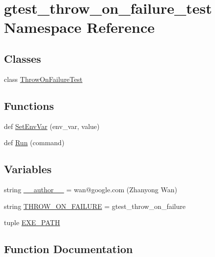 \hypertarget{namespacegtest__throw__on__failure__test}{}\section{gtest\+\_\+throw\+\_\+on\+\_\+failure\+\_\+test Namespace Reference}
\label{namespacegtest__throw__on__failure__test}
\subsection*{Classes}
\begin{DoxyCompactItemize}
\item 
class \hyperlink{classgtest__throw__on__failure__test_1_1_throw_on_failure_test}{Throw\+On\+Failure\+Test}
\end{DoxyCompactItemize}
\subsection*{Functions}
\begin{DoxyCompactItemize}
\item 
def \hyperlink{namespacegtest__throw__on__failure__test_a79d85cfffbf8e8381ba32483ddc305c0}{Set\+Env\+Var} (env\+\_\+var, value)
\item 
def \hyperlink{namespacegtest__throw__on__failure__test_a8ffdd989cd023f53d37f4f7993c017fe}{Run} (command)
\end{DoxyCompactItemize}
\subsection*{Variables}
\begin{DoxyCompactItemize}
\item 
string \hyperlink{namespacegtest__throw__on__failure__test_afd3c4d4809a79f0b4de8b2372cba5bb8}{\+\_\+\+\_\+author\+\_\+\+\_\+} = \textquotesingle{}wan@google.\+com (Zhanyong Wan)\textquotesingle{}
\item 
string \hyperlink{namespacegtest__throw__on__failure__test_af837d05b7ed8498aed8202c1d83d1e7a}{T\+H\+R\+O\+W\+\_\+\+O\+N\+\_\+\+F\+A\+I\+L\+U\+R\+E} = \textquotesingle{}gtest\+\_\+throw\+\_\+on\+\_\+failure\textquotesingle{}
\item 
tuple \hyperlink{namespacegtest__throw__on__failure__test_a21b57c780e17de8f6aa8c88652b290be}{E\+X\+E\+\_\+\+P\+A\+T\+H}
\end{DoxyCompactItemize}


\subsection{Function Documentation}
\hypertarget{namespacegtest__throw__on__failure__test_a8ffdd989cd023f53d37f4f7993c017fe}{}

